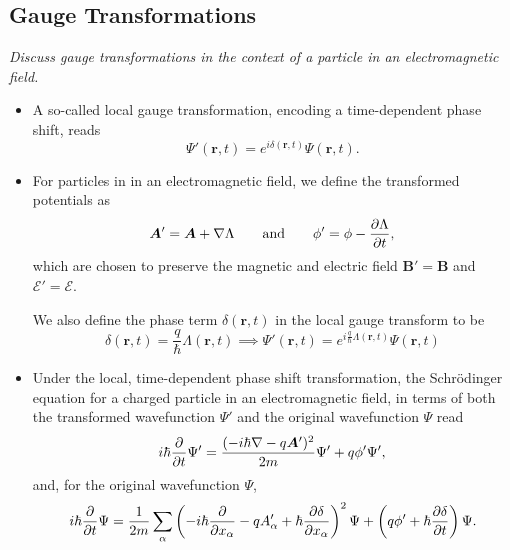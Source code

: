 \documentclass[11pt, a4paper]{article}
\renewcommand{\grad}{\nabla}
\newcommand{\eqtext}[1]{\qquad \text{#1} \qquad}
\newcommand{\Schro}{Schr\"{o}dinger\xspace}
\renewcommand{\vec}[1]{\bm{#1}}  %
\renewcommand{\r}{\vec{r}}  %
\newcommand{\A}{\vec{A}}  %
\newcommand{\B}{\vec{B}}  %
\renewcommand{\P}{\Psi}  %
\begin{document}
\subsection{Gauge Transformations}
\textit{Discuss gauge transformations in the context of a particle in an electromagnetic field.}

\begin{itemize}
    \item A so-called local gauge transformation, encoding a time-dependent phase shift, reads
	\begin{equation*}
		\P'(\r, t) = e^{i\delta (\r, t)} \P(\r, t).
	\end{equation*}

    \item For particles in in an electromagnetic field, we define the transformed potentials as
	\begin{equation*}
		\A' = \A + \grad \Lambda \eqtext{and} \phi' = \phi - \pdv{\Lambda}{t},
	\end{equation*}
	which are chosen to preserve the magnetic and electric field $ \B' = \B $ and $ \vec{\mathcal{E}}' = \vec{\mathcal{E}} $.

    We also define the phase term $ \delta(\r, t) $ in the local gauge transform to be
	\begin{equation*}
		\delta(\r, t) = \frac{q}{\hbar}\Lambda(\r, t) \implies \P'(\r, t) = e^{i\frac{q}{\hbar}\Lambda(\r, t)} \P(\r, t)
	\end{equation*}

    \item Under the local, time-dependent phase shift transformation, the \Schro equation for a charged particle in an electromagnetic field, in terms of both the transformed wavefunction $ \Psi' $ and the original wavefunction $ \Psi $ read
	\begin{equation*}
	    i\hbar \pdv{t}\P' = \frac{(-i\hbar \grad - q\A')^{2}}{2m} \P' + q \phi' \P',
	\end{equation*}
    and, for the original wavefunction $ \Psi $,
	\begin{equation*}
		i\hbar \pdv{t}\P = \frac{1}{2m}\sum_{\alpha}\left(-i\hbar \pdv{x_{\alpha}} - q A'_{\alpha} + \hbar \pdv{\delta}{x_{\alpha}}\right)^{2} \P + \left(q\phi' + \hbar \pdv{\delta}{t}\right)\P.
	\end{equation*}


\end{itemize}
\end{document}
